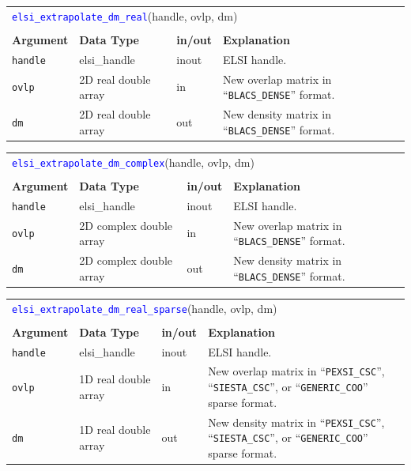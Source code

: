 \documentclass{report}
\newcommand{\api}[1]{\textcolor{blue}{\texttt{#1}}}
\begin{document}
\begin{tabular}[]{|p{20mm}|p{40mm}|p{10mm}|p{92mm}|}
\multicolumn{4}{l}{\api{elsi\_extrapolate\_dm\_real}(handle, ovlp, dm)}\\
\multicolumn{4}{l}{}\\
\hline
\multicolumn{1}{|l|}{\textbf{Argument}} & \multicolumn{1}{l|}{\textbf{Data Type}} & \multicolumn{1}{l|}{\textbf{in/out}} & \multicolumn{1}{l|}{\textbf{Explanation}}\\
\hline
\texttt{handle} & elsi\_handle         & inout & ELSI handle.\\
\hline
\texttt{ovlp}   & 2D real double array & in    & New overlap matrix in ``\texttt{BLACS\_DENSE}'' format.\\
\hline
\texttt{dm}     & 2D real double array & out   & New density matrix in ``\texttt{BLACS\_DENSE}'' format.\\
\hline
\end{tabular}

\begin{tabular}[]{|p{20mm}|p{40mm}|p{10mm}|p{92mm}|}
\multicolumn{4}{l}{\api{elsi\_extrapolate\_dm\_complex}(handle, ovlp, dm)}\\
\multicolumn{4}{l}{}\\
\hline
\multicolumn{1}{|l|}{\textbf{Argument}} & \multicolumn{1}{l|}{\textbf{Data Type}} & \multicolumn{1}{l|}{\textbf{in/out}} & \multicolumn{1}{l|}{\textbf{Explanation}}\\
\hline
\texttt{handle} & elsi\_handle            & inout & ELSI handle.\\
\hline
\texttt{ovlp}   & 2D complex double array & in    & New overlap matrix in ``\texttt{BLACS\_DENSE}'' format.\\
\hline
\texttt{dm}     & 2D complex double array & out   & New density matrix in ``\texttt{BLACS\_DENSE}'' format.\\
\hline
\end{tabular}

\begin{tabular}[]{|p{20mm}|p{40mm}|p{10mm}|p{92mm}|}
\multicolumn{4}{l}{\api{elsi\_extrapolate\_dm\_real\_sparse}(handle, ovlp, dm)}\\
\multicolumn{4}{l}{}\\
\hline
\multicolumn{1}{|l|}{\textbf{Argument}} & \multicolumn{1}{l|}{\textbf{Data Type}} & \multicolumn{1}{l|}{\textbf{in/out}} & \multicolumn{1}{l|}{\textbf{Explanation}}\\
\hline
\texttt{handle} & elsi\_handle         & inout & ELSI handle.\\
\hline
\texttt{ovlp}   & 1D real double array & in    & New overlap matrix in ``\texttt{PEXSI\_CSC}'', ``\texttt{SIESTA\_CSC}'', or ``\texttt{GENERIC\_COO}'' sparse format.\\
\hline
\texttt{dm}     & 1D real double array & out   & New density matrix in ``\texttt{PEXSI\_CSC}'', ``\texttt{SIESTA\_CSC}'', or ``\texttt{GENERIC\_COO}'' sparse format.\\
\hline
\end{tabular}
\end{document}
